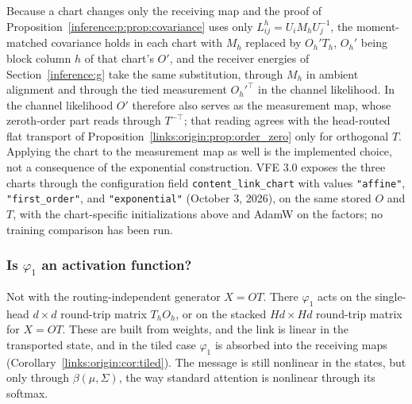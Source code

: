 \documentclass[11pt]{article}
\theoremstyle{definition}
\theoremstyle{remark}
\providecommand{\cfg}[1]{{\small\texttt{#1}}}
\begin{document}
Because a chart changes only the receiving map and the proof of Proposition~\ref{inference:p:prop:covariance} uses only $L_{ij}^{h}=U_iM_hU_j^{-1}$, the moment-matched covariance holds in each chart with $M_h$ replaced by $O_h'T_h$, $O_h'$ being block column $h$ of that chart's $O'$, and the receiver energies of Section~\ref{inference:g} take the same substitution, through $M_h$ in ambient alignment and through the tied measurement $O_h'^\top$ in the channel likelihood. In the channel likelihood $O'$ therefore also serves as the measurement map, whose zeroth-order part reads through $T^{-\top}$; that reading agrees with the head-routed flat transport of Proposition~\ref{links:origin:prop:order_zero} only for orthogonal $T$. Applying the chart to the measurement map as well is the implemented choice, not a consequence of the exponential construction. VFE 3.0 exposes the three charts through the configuration field \cfg{content\_link\_chart} with values \cfg{"affine"}, \cfg{"first\_order"}, and \cfg{"exponential"} (October 3, 2026), on the same stored $O$ and $T$, with the chart-specific initializations above and AdamW on the factors; no training comparison has been run.

\subsubsection{Is \texorpdfstring{$\varphi_1$}{phi} an activation function?}

Not with the routing-independent generator $X=OT$. There $\varphi_1$ acts on the single-head $d\times d$ round-trip matrix $T_hO_h$, or on the stacked $Hd\times Hd$ round-trip matrix for $X=OT$. These are built from weights, and the link is linear in the transported state, and in the tiled case $\varphi_1$ is absorbed into the receiving maps (Corollary~\ref{links:origin:cor:tiled}). The message is still nonlinear in the states, but only through $\beta(\mu,\Sigma)$, the way standard attention is nonlinear through its softmax.
\end{document}
